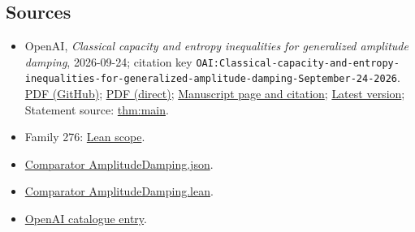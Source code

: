 \documentclass[11pt]{article}
\begin{document}
\subsection{Sources}
\begin{itemize}
\item OpenAI, \emph{Classical capacity and entropy inequalities for generalized amplitude damping}, 2026-09-24; citation key \texttt{OAI:Classical-capacity-and-entropy-inequalities-for-generalized-amplitude-damping-September-24-2026}. \href{https://github.com/openai/math/blob/adc7f1241b42e322a6451854ab7e4b4c146bf78a/preprints/Classical-capacity-and-entropy-inequalities-for-generalized-amplitude-damping-September-24-2026/paper.pdf}{PDF (GitHub)}; \href{https://github.com/openai/math/raw/adc7f1241b42e322a6451854ab7e4b4c146bf78a/preprints/Classical-capacity-and-entropy-inequalities-for-generalized-amplitude-damping-September-24-2026/paper.pdf}{PDF (direct)}; \href{https://github.com/openai/math/blob/adc7f1241b42e322a6451854ab7e4b4c146bf78a/preprints/Classical-capacity-and-entropy-inequalities-for-generalized-amplitude-damping-September-24-2026/README.md}{Manuscript page and citation}; \href{https://github.com/openai/math/blob/main/preprints/Classical-capacity-and-entropy-inequalities-for-generalized-amplitude-damping-September-24-2026/paper.pdf}{Latest version}; Statement source: \href{https://github.com/openai/math/blob/adc7f1241b42e322a6451854ab7e4b4c146bf78a/preprints/Classical-capacity-and-entropy-inequalities-for-generalized-amplitude-damping-September-24-2026/build/paper.tex\#L208}{thm:main}.
\item Family 276: \href{https://github.com/openai/math/blob/adc7f1241b42e322a6451854ab7e4b4c146bf78a/lean/docs/276.md}{Lean scope}.
\item \href{https://github.com/openai/math/blob/adc7f1241b42e322a6451854ab7e4b4c146bf78a/lean/ComparatorChallenges/AmplitudeDamping.json}{Comparator AmplitudeDamping.json}.
\item \href{https://github.com/openai/math/blob/adc7f1241b42e322a6451854ab7e4b4c146bf78a/lean/ComparatorChallenges/AmplitudeDamping.lean}{Comparator AmplitudeDamping.lean}.
\item \href{https://github.com/openai/math/blob/adc7f1241b42e322a6451854ab7e4b4c146bf78a/CONTENTS.md}{OpenAI catalogue entry}.
\end{itemize}
\end{document}
